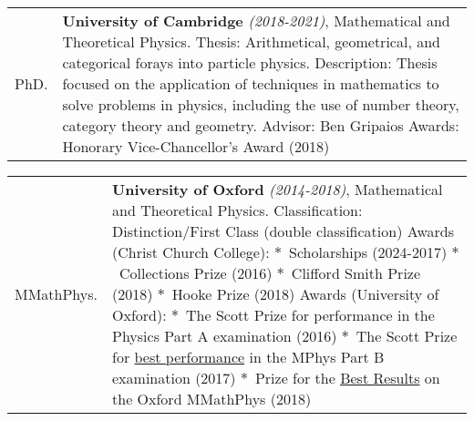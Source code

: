 \documentclass[14pt,letter]{article}
\newcommand{\mybullet}{\textcolor{mycolor}{$\ast$}\ }
\newcounter{customtitle}
\begin{document}
\noindent\begin{tabular}{p{}p{}}
	PhD. &  \textbf{University of Cambridge} \emph{(2018-2021)}, Mathematical and Theoretical Physics.
	\newline 
	{\color{mycolor} Thesis:}  Arithmetical, geometrical, and categorical forays into particle physics. 
	\newline 
	{\color{mycolor} Description:}  Thesis focused on the application of techniques in mathematics to solve problems in physics, including the use of number theory, category theory and geometry.
	\newline 
	{\color{mycolor} Advisor:} Ben Gripaios 
	\newline
	{\color{mycolor}Awards:} Honorary Vice-Chancellor’s Award (2018)
\end{tabular}

\noindent\begin{tabular}{p{}p{}}
	MMathPhys. &  \textbf{University of Oxford} \emph{(2014-2018)}, Mathematical and Theoretical Physics.
	\newline 
	{\color{mycolor}Classification:} { Distinction/First Class (double classification) }
	\newline 
	{\color{mycolor}Awards (Christ Church College):} \mybullet Scholarships (2024-2017) \mybullet Collections Prize (2016) \mybullet  Clifford Smith Prize (2018) \mybullet Hooke Prize (2018)
	\newline
	{\color{mycolor}Awards (University of Oxford):}  \mybullet The Scott Prize for performance in the Physics Part A examination (2016) \mybullet The Scott Prize for \underline{best performance} in the MPhys Part B examination (2017)  \mybullet Prize for the \underline{Best Results} on the Oxford MMathPhys (2018) 
\end{tabular}
%
\end{document}
